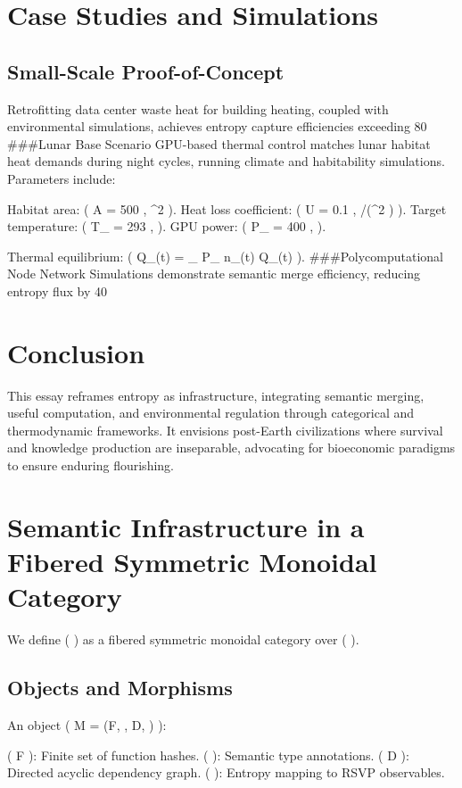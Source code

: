 \documentclass[12pt]{article}
\begin{document}
\section{Case Studies and Simulations}
\label{sec:case-studies}
\subsection{Small-Scale Proof-of-Concept}
Retrofitting data center waste heat for building heating, coupled with environmental simulations, achieves entropy capture efficiencies exceeding 80%
###{Lunar Base Scenario}
GPU-based thermal control matches lunar habitat heat demands during night cycles, running climate and habitability simulations. Parameters include:

Habitat area: ( A = 500 , ^2 ).
Heat loss coefficient: ( U = 0.1 , /(^2 \cdot {}) ).
Target temperature: ( T_{} = 293 ,  ).
GPU power: ( P_{} = 400 ,  ).

Thermal equilibrium: ( Q_{}(t) = \eta_{} \cdot P_{} \cdot n_{}(t) \approx Q_{}(t) ).
###{Polycomputational Node Network}
Simulations demonstrate semantic merge efficiency, reducing entropy flux by 40%
\section{Conclusion}
\label{sec:conclusion}
This essay reframes entropy as infrastructure, integrating semantic merging, useful computation, and environmental regulation through categorical and thermodynamic frameworks. It envisions post-Earth civilizations where survival and knowledge production are inseparable, advocating for bioeconomic paradigms to ensure enduring flourishing.
\appendix
\section{Semantic Infrastructure in a Fibered Symmetric Monoidal Category}
\label{app:semantic-infra}
We define (  ) as a fibered symmetric monoidal category over (  ).
\subsection{Objects and Morphisms}
An object ( M = (F, \Sigma, D, \varphi) ):

( F ): Finite set of function hashes.
( \Sigma ): Semantic type annotations.
( D ): Directed acyclic dependency graph.
( \varphi ): Entropy mapping to RSVP observables.
\end{document}

